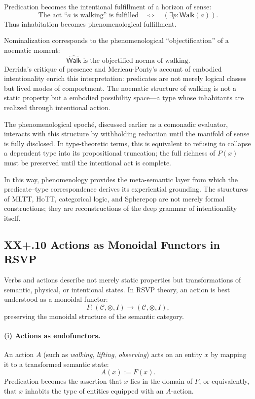 \documentclass[12pt,letterpaper]{article}
\begin{document}
Predication becomes the intentional fulfillment of a horizon of sense:
\[
\text{The act ``$a$ is walking'' is fulfilled}
\quad\Longleftrightarrow\quad
(\exists p : \mathsf{Walk}(a)).
\]
Thus inhabitation becomes phenomenological fulfillment.

Nominalization corresponds to the phenomenological ``objectification'' of a
noematic moment:
\[
\widehat{\mathsf{Walk}} \;\text{is the objectified noema of walking}.
\]
Derrida’s critique of presence and Merleau-Ponty’s account of embodied
intentionality enrich this interpretation: predicates are not merely logical
classes but lived modes of comportment.  The noematic structure of walking is
not a static property but a embodied possibility space---a type whose
inhabitants are realized through intentional action.

The phenomenological epoché, discussed earlier as a comonadic evaluator,
interacts with this structure by withholding reduction until the manifold of
sense is fully disclosed.  In type-theoretic terms, this is equivalent to
refusing to collapse a dependent type into its propositional truncation; the
full richness of $P(x)$ must be preserved until the intentional act is complete.

In this way, phenomenology provides the meta-semantic layer from which the
predicate--type correspondence derives its experiential grounding.  The structures
of MLTT, HoTT, categorical logic, and Spherepop are not merely formal
constructions; they are reconstructions of the deep grammar of intentionality
itself.

\subsection{XX+.10 Actions as Monoidal Functors in RSVP}

Verbs and actions describe not merely static properties but transformations of
semantic, physical, or intentional states.  In RSVP theory, an action is best
understood as a monoidal functor:
\[
F : (\mathcal{C}, \otimes, I) \to (\mathcal{C}, \otimes, I),
\]
preserving the monoidal structure of the semantic category.

\paragraph{(i) Actions as endofunctors.}
An action $A$ (such as \emph{walking}, \emph{lifting}, \emph{observing}) acts on
an entity $x$ by mapping it to a transformed semantic state:
\[
A(x) := F(x).
\]
Predication becomes the assertion that $x$ lies in the domain of $F$, or
equivalently, that $x$ inhabits the type of entities equipped with an $A$-action.
\end{document}
